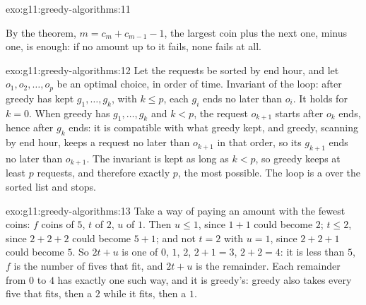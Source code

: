 \begin{solution}{exo:g11:greedy-algorithms:11}
\smallskip\noindent\hspace*{2em}

\noindent\hspace*{4em}

\noindent\hspace*{10em}

\smallskip\noindent By the theorem, $m = c_m + c_{m-1} - 1$, the largest coin plus the next one, minus one, is
enough: if no amount up to it fails, none fails at all.
\end{solution}

\begin{solution}{exo:g11:greedy-algorithms:12}
Let the requests be sorted by end hour, and let $o_1, o_2, \dots, o_p$ be an optimal choice, in order of time. Invariant of
the loop: after greedy has kept $g_1, \dots, g_k$, with $k \le p$, each $g_i$ ends no later than $o_i$. It holds for
$k = 0$. When greedy has $g_1, \dots, g_k$ and $k < p$, the request $o_{k+1}$ starts after $o_k$ ends, hence after
$g_k$ ends: it is compatible with what greedy kept, and greedy, scanning by end hour, keeps a request no later than
$o_{k+1}$ in that order, so its $g_{k+1}$ ends no later than $o_{k+1}$. The invariant is kept as long as $k < p$, so
greedy keeps at least $p$ requests, and therefore exactly $p$, the most possible. The loop is a  over the
sorted list and stops.
\end{solution}

\begin{solution}{exo:g11:greedy-algorithms:13}
Take a way of paying an amount with the fewest coins: $f$ coins of $5$, $t$ of $2$, $u$ of $1$. Then $u \le 1$, since
$1 + 1$ could become $2$; $t \le 2$, since $2 + 2 + 2$ could become $5 + 1$; and not $t = 2$ with $u = 1$, since
$2 + 2 + 1$ could become $5$. So $2t + u$ is one of $0$, $1$, $2$, $2 + 1 = 3$, $2 + 2 = 4$: it is less than $5$, $f$ is
the number of fives that fit, and $2t + u$ is the remainder. Each remainder from $0$ to $4$ has exactly one such way,
and it is greedy's: greedy also takes every five that fits, then a $2$ while it fits, then a $1$.
\end{solution}

